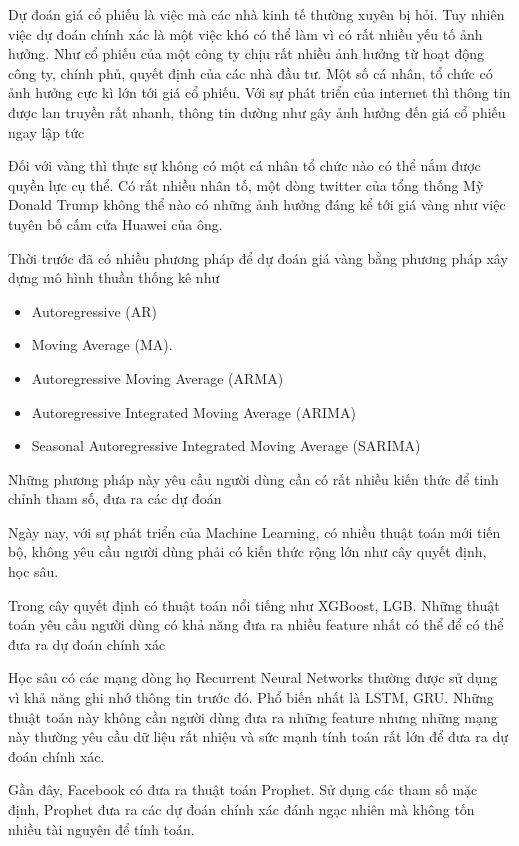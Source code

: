 Dự đoán giá cổ phiếu là việc mà các nhà kinh tế thường xuyên bị hỏi.
Tuy nhiên việc dự đoán chính xác là một việc khó có thể làm vì có rất nhiều yếu tố ảnh hưởng.
Như cổ phiếu của một công ty chịu rất nhiều ảnh hưởng từ hoạt động công ty, chính phủ, quyết định của các nhà đầu tư.
Một số cá nhân, tổ chức có ảnh hưởng cực kì lớn tới giá cổ phiếu.
Với sự phát triển của internet thì thông tin được lan truyền rất nhanh, thông tin dường như gây ảnh hưởng đến giá cổ phiếu ngay lập tức

Đối với vàng thì thực sự không có một cá nhân tổ chức nào có thể nắm được quyền lực cụ thể.
Có rất nhiều nhân tố, một dòng twitter của tổng thống Mỹ Donald Trump không thể nào có những ảnh hưởng đáng kể tới giá vàng như việc tuyên bố cấm cửa Huawei của ông.

Thời trước đã có nhiều phương pháp để dự đoán giá vàng bằng phương pháp xây dựng mô hình thuần thống kê như
\begin{itemize}
    \item Autoregressive (AR)
    \item Moving Average (MA).
    \item Autoregressive Moving Average (ARMA)
    \item Autoregressive Integrated Moving Average (ARIMA)
    \item Seasonal Autoregressive Integrated Moving Average (SARIMA)
\end{itemize}
Những phương pháp này yêu cầu người dùng cần có rất nhiều kiến thức để tinh chỉnh tham số, đưa ra các dự đoán

Ngày nay, với sự phát triển của Machine Learning, có nhiều thuật toán mới tiến bộ, không yêu cầu người dùng phải
có kiến thức rộng lớn như cây quyết định, học sâu.

Trong cây quyết định có thuật toán nổi tiếng như XGBoost, LGB. Những thuật toán yêu cầu người dùng có khả năng đưa ra nhiều feature nhất có thể
để có thể đưa ra dự đoán chính xác

Học sâu có các mạng dòng họ Recurrent Neural Networks thường được sử dụng vì khả năng ghi nhớ thông tin trước đó. Phổ biến nhất là LSTM, GRU. Những thuật toán
này không cần người dùng đưa ra những feature nhưng những mạng này thường yêu cầu dữ liệu rất nhiệu và sức mạnh tính toán rất lớn để đưa ra dự đoán chính xác.

Gần đây, Facebook có đưa ra thuật toán Prophet. Sử dụng các tham số mặc định, Prophet đưa ra các dự đoán chính xác đánh ngạc nhiên mà không
tốn nhiều tài nguyên để tính toán.

